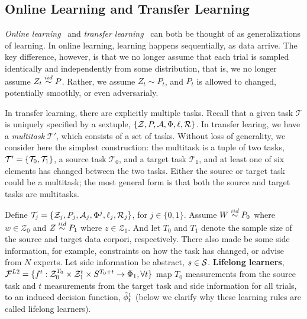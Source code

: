 \documentclass{article}
\begin{document}
\subsection{Online Learning and Transfer Learning}

\emph{Online learning}~\cite{Mohri2018-tf} and \emph{transfer learning}~\cite{Pan2010-bv} can both be thought of as generalizations of learning.  In online learning, learning happens sequentially, as data arrive.  The key difference, however, is that we no longer assume that each trial is sampled identically and independently from some distribution, that is, we no longer assume $Z_t \overset{iid}{\sim} P$.  Rather, we assume $Z_t \sim P_t$, and $P_t$ is allowed to changed, potentially smoothly, or even adversarialy.  

In transfer learning, there are explicitly multiple tasks. 
Recall that a given task $\mathcal{T}$ is uniquely specified by a sextuple, $\{\mathcal{Z}, P, \mathcal{A}, \Phi, \ell, \mathcal{R}\}$.  In transfer learing, we have a \emph{multitask} $\mathcal{T}'$, which  consists of a set of tasks.  Without loss of generality, we consider here the simplest construction: the multitask is a tuple of two tasks, $\mathcal{T}'=\{\mathcal{T}_0, \mathcal{T}_1\}$,  a source task $\mathcal{T}_0$, and a target task $\mathcal{T}_1$, and at least one of six elements has changed between the two tasks.  Either the source or target task could be a multitask; the most general form is that both the source and target tasks are multitasks. 


Define $\mathcal{T}_j=\{\mathcal{Z}_j, P_j, \mathcal{A}_j, \Phi^j, \ell_j, \mathcal{R}_j\}$, for $j \in \{0,1\}$.  Assume  $W \overset{iid}{\sim} P_0$ where $w \in \mathcal{Z}_0$ and 
$Z \overset{iid}{\sim} P_1$ where $z \in \mathcal{Z}_1$.  
And let $T_0$ and $T_1$ denote the sample size of the source and target data corpori, respectively. 
There also made be some side information, for example, constraints on how the task has changed, or advise from $N$ experts. Let side information be abstract, $s \in \mathcal{S}$. \textbf{Lifelong learners}, $\mathcal{F}^{L2}=\{ f^t: \mathcal{Z}_0^{T_0} \times \mathcal{Z}_1^t \times {S}^{T_0+t} \to \Phi_1, \forall t\}$ map $T_0$ measurements from the source task and $t$ measurements from the target task and side information for all trials,  to an induced decision function, $\hat{\phi}_t^1$ (below we clarify why these learning rules are called lifelong learners). 
\end{document}
